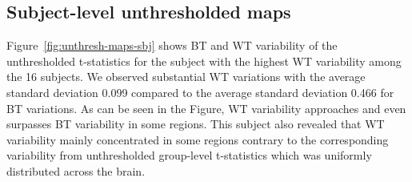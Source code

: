   \begin{figure}[ht]
  \end{figure}


  \subsection{Subject-level unthresholded maps}

  Figure~\ref{fig:unthresh-maps-sbj} shows BT and WT variability of the
  unthresholded t-statistics for the subject with the highest WT
  variability among the 16 subjects.
  We observed substantial WT variations with the average standard deviation 0.099 compared to 
  the average standard deviation 0.466 for BT variations.
  As can be seen in the Figure, WT variability approaches and even surpasses BT variability in some regions.
  This subject also revealed that WT variability mainly concentrated in some regions  
  contrary to the corresponding variability from unthresholded group-level t-statistics which was uniformly distributed across the brain.

